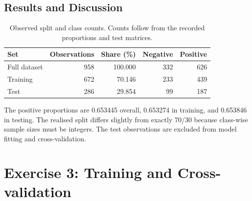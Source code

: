 \documentclass[11pt,a4paper]{article}
\begin{document}
\subsection{Results and Discussion}

\begin{table}[htbp]\centering
    \begin{tabular}{lrrrr}\toprule
        Set          & Observations & Share (\%) & Negative & Positive \\\midrule
        Full dataset & 958          & 100.000    & 332      & 626      \\
        Training     & 672          & 70.146     & 233      & 439      \\
        Test         & 286          & 29.854     & 99       & 187      \\\bottomrule
    \end{tabular}
    \caption{Observed split and class counts. Counts follow from the recorded proportions and test matrices.}
\end{table}
The positive proportions are 0.653445 overall, 0.653274 in training, and 0.653846 in testing. The realised split differs slightly from exactly 70/30 because class-wise sample sizes must be integers. The test observations are excluded from model fitting and cross-validation.

\section{Exercise 3: Training and Cross-validation}
\end{document}
